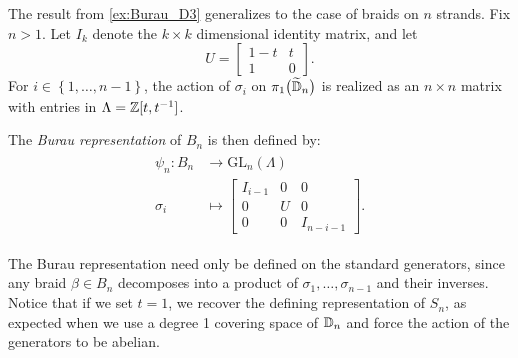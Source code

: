 The result from \cref{ex:Burau_D3} generalizes to the case of braids on $n$ strands. Fix $n>1$. Let $I_k$ denote the $k\times k$ dimensional identity matrix, and let
\begin{equation}
    U=\begin{bmatrix}
        1-t & t \\ 1 & 0
    \end{bmatrix}.
\end{equation} 
For $i\in\left\{ 1,\dots,n-1 \right\}$, the action of $\sigma_i$ on $\pi_1\bigl( \widetilde{\mathbb{D}}_n \bigr)$ is realized as an $n\times n$ matrix with entries in $\Lambda = \mathbb{Z}[t,{ t }^{-1}]$. 

The \textit{Burau representation} of $B_n$ is then defined by:
\begin{align}
    \begin{split}        
    \psi_n:B_n&\to\textrm{GL}_n(\Lambda) \\
    \sigma_i &\mapsto \begin{bmatrix}
        I_{i-1} & 0 & 0 \\
        0 & U & 0 \\
        0 & 0 & I_{n-i-1}
    \end{bmatrix}.
    \end{split}
\end{align}

The Burau representation need only be defined on the standard generators, since any braid $\beta\in B_n$ decomposes into a product of $\sigma_1,\dots,\sigma_{n-1}$ and their inverses. Notice that if we set $t = 1$, we recover the defining representation of $S_n$, as expected when we use a degree 1 covering space of $\mathbb{D}_n$ and force the action of the generators to be abelian.

